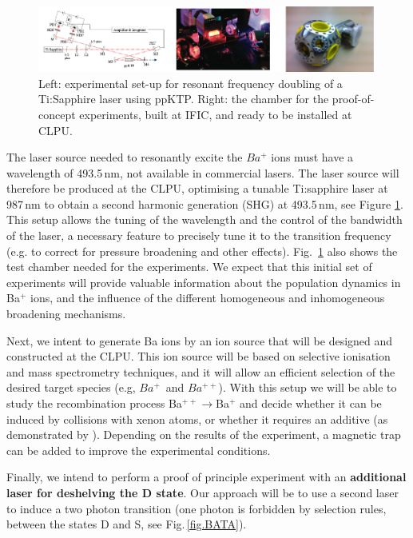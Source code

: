 \begin{figure}
\begin{center}
\includegraphics[width=0.99\textwidth]{img/blueLaser.png}
\caption{\small Left: experimental set-up for resonant frequency doubling of a 
Ti:Sapphire laser using ppKTP. Right: the chamber for the proof-of-concept experiments, built at IFIC, and ready to be installed at CLPU.}
\label{fig:chamber}
\end{center}
\end{figure}

The laser source needed to resonantly excite the $Ba^{+}$ ions must have a wavelength of 493.5\,nm, not available in commercial lasers. The laser source will therefore be produced at the CLPU, optimising a tunable Ti:sapphire laser at 987\,nm to obtain a second harmonic generation (SHG) at 493.5\,nm, see Figure \ref{fig:chamber}. This setup allows the tuning of the wavelength and the control of the bandwidth of the laser, a necessary feature to precisely tune it to the transition frequency (e.g. to correct for pressure broadening and other effects). Fig.~\ref{fig:chamber} also shows the test chamber needed for the experiments. 
We expect that this initial set of experiments will provide valuable information about the population dynamics in Ba$^+$ ions, and the influence of the different homogeneous and inhomogeneous broadening mechanisms. 

Next, we intent to generate Ba ions by an ion source that will be designed and constructed at the CLPU. This ion source will be based on selective ionisation and mass spectrometry techniques, and it will allow an efficient selection of the desired target species (e.g, $Ba^{+}$~and $Ba^{++}$). With this setup we will be able to study the recombination process Ba$^{++}\rightarrow$Ba$^{+}$ and decide whether it can be induced by collisions with xenon atoms, or whether it requires an additive (as demonstrated by ). Depending on the results of the experiment, a magnetic trap can be added to improve the experimental conditions. 

Finally, we intend to perform a proof of principle experiment with an {\bf additional laser for deshelving the D state}. Our approach will be to use a second laser to induce a two photon transition (one photon is forbidden by selection rules, between the states D and S, see Fig.\,\ref{fig.BATA}). 	

